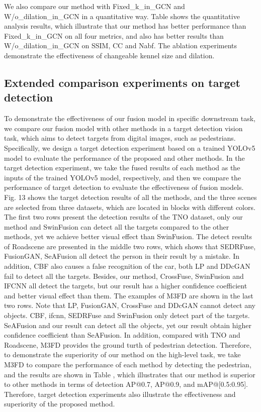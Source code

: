 \documentclass[journal]{IEEEtran}
\begin{document}
We also compare our method with Fixed\_k\_in\_GCN and W/o\_dilation\_in\_GCN in a quantitative way. Table \uppercase\expandafter{} shows the quantitative analysis results, which illustrate that our method has better performance than Fixed\_k\_in\_GCN on all four metrics, and also has better results than W/o\_dilation\_in\_GCN on SSIM, CC and Nabf. The ablation experiments demonstrate the effectiveness of changeable kennel size and dilation.

\subsection{Extended comparison experiments on target detection}
To demonstrate the effectiveness of our fusion model in specific downstream task, we compare our fusion model with other methods in a target detection vision task, which aims to detect targets from digital images, such as pedestrians. Specifically, we design a target detection experiment based on a trained YOLOv5 \cite{redmon2016you} model to evaluate the performance of the proposed and other methods. In the target detection experiment, we take the fused results of each method as the inputs of the trained YOLOv5 model, respectively, and then we compare the performance of target detection to evaluate the effectiveness of fusion models. Fig. 13 shows the target detection results of all the methods, and the three scenes are selected from three datasets, which are located in blocks with different colors. The first two rows present the detection results of the TNO dataset, only our method and SwinFusion can detect all the targets compared to the other methods, yet we achieve better visual effect than SwinFusion. The detect results of Roadscene are presented in the middle two rows, which shows that SEDRFuse, FusionGAN, SeAFusion all detect the person in their result by a mistake. In addition, CBF also causes a false recognition of the car, both LP and DDcGAN fail to detect all the targets. Besides, our method, CrossFuse, SwinFusion and IFCNN all detect the targets, but our result has a higher confidence coefficient and better visual effect than them. The examples of M3FD are shown in the last two rows. Note that LP, FusionGAN, CrossFuse and DDcGAN cannot detect any objects. CBF, ifcnn, SEDRFuse and SwinFusion only detect part of the targets. SeAFusion and our result can detect all the objects, yet our result obtain higher confidence coefficient than SeAFusion. In addition, compared with TNO and Roadscene, M3FD provides the ground turth of pedestrian detection. Therefore, to demonstrate the superiority of our method on the high-level task, we take M3FD to compare the performance of each method by detecting the pedestrian, and the results are shown in Table {\uppercase\expandafter{}}, which illustrates that our method is superior to other methods in terms of detection AP@0.7, AP@0.9, and mAP@[0.5:0.95]. Therefore, target detection experiments also illustrate the effectiveness and superiority of the proposed method.
\end{document}
